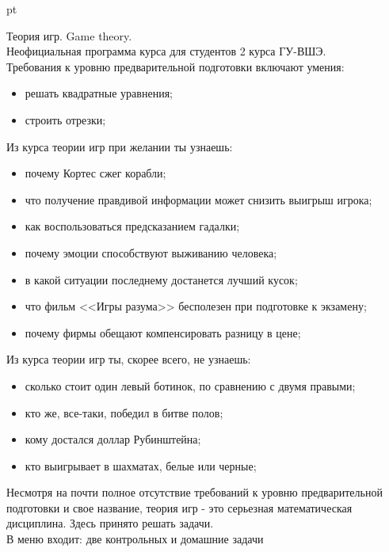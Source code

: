\documentclass[pdftex,12pt,a4paper]{article}
\begin{document}
 pt

Теория игр. Game theory. \\
Неофициальная программа курса для студентов 2 курса ГУ-ВШЭ.\\

Требования к уровню предварительной подготовки включают умения:\\
\begin{itemize}
\item решать квадратные уравнения;
\item строить отрезки;
\end{itemize}


Из курса теории игр при желании ты узнаешь:\\
\begin{itemize}
\item почему Кортес сжег корабли;
\item что получение правдивой информации может снизить выигрыш игрока;
\item как воспользоваться предсказанием гадалки;
\item почему эмоции способствуют выживанию человека;
\item в какой ситуации последнему достанется лучший кусок;
\item что фильм <<Игры разума>> бесполезен при подготовке к экзамену;
\item почему фирмы обещают компенсировать разницу в цене;
\end{itemize}


Из курса теории игр ты, скорее всего, не узнаешь:
\begin{itemize}
\item сколько стоит один левый ботинок, по сравнению с двумя правыми;
\item кто же, все-таки, победил в битве полов;
\item кому достался доллар Рубинштейна;
\item кто выигрывает в шахматах, белые или черные;
\end{itemize}

Несмотря на почти полное отсутствие требований к уровню предварительной подготовки и свое название, теория игр - это серьезная математическая дисциплина. Здесь принято решать задачи.\\

В меню входит: две контрольных и домашние задачи\\
\end{document}
